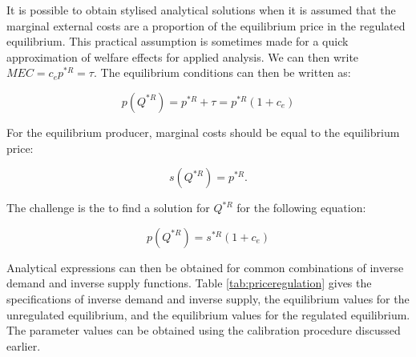 \documentclass[
]{book}
\begin{document}
It is possible to obtain stylised analytical solutions when it is assumed that the marginal external costs are a proportion of the equilibrium price in the regulated equilibrium. This practical assumption is sometimes made for a quick approximation of welfare effects for applied analysis. We can then write \(MEC=c_e p^{*R}=\tau\). The equilibrium conditions can then be written as:

\begin{equation}
p(Q^{* R}) = p^{* R} + \tau = p^{* R} (1 + c_e)
\end{equation}

For the equilibrium producer, marginal costs should be equal to the equilibrium price:

\begin{equation}
s(Q^{* R} )=p^{* R}.
\end{equation}

The challenge is the to find a solution for \(Q^{* R}\) for the following equation:

\begin{equation}
p(Q^{* R}) = s^{* R} (1 + c_e)
\end{equation}

Analytical expressions can then be obtained for common combinations of inverse demand and inverse supply functions. Table \ref{tab:priceregulation} gives the specifications of inverse demand and inverse supply, the equilibrium values for the unregulated equilibrium, and the equilibrium values for the regulated equilibrium. The parameter values can be obtained using the calibration procedure discussed earlier.
\end{document}
